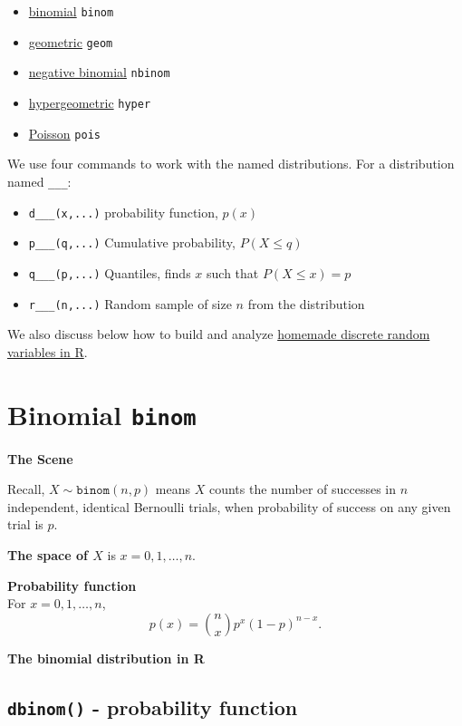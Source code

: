 \documentclass[
]{book}
\providecommand{\tightlist}{%
  \setlength{\itemsep}{0pt}\setlength{\parskip}{0pt}}
\theoremstyle{definition}
\theoremstyle{definition}
\theoremstyle{definition}
\theoremstyle{definition}
\theoremstyle{remark}
\begin{document}
\begin{itemize}
\tightlist
\item
  \hyperref[binomialR]{binomial} \textbar{} \texttt{binom}
\item
  \hyperref[geometricR]{geometric} \textbar{} \texttt{geom}
\item
  \hyperref[negbinomR]{negative binomial} \textbar{} \texttt{nbinom}
\item
  \hyperref[hyperR]{hypergeometric} \textbar{} \texttt{hyper}
\item
  \hyperref[poissonR]{Poisson} \textbar{} \texttt{pois}
\end{itemize}

We use four commands to work with the named distributions. For a distribution named \texttt{\_\_\_}:

\begin{itemize}
\tightlist
\item
  \texttt{d\_\_\_(x,...)} \textbar{} probability function, \(p(x)\)
\item
  \texttt{p\_\_\_(q,...)} \textbar{} Cumulative probability, \(P(X \leq q)\)
\item
  \texttt{q\_\_\_(p,...)} \textbar{} Quantiles, finds \(x\) such that \(P(X \leq x) = p\)
\item
  \texttt{r\_\_\_(n,...)} \textbar{} Random sample of size \(n\) from the distribution
\end{itemize}

We also discuss below how to build and analyze \hyperref[custom-discrete-R]{homemade discrete random variables in R}.

\section{\texorpdfstring{Binomial \texttt{binom}}{Binomial binom}}\label{binomialR}

\textbf{The Scene}

Recall, \(X \sim \texttt{binom}(n,p)\) means \(X\) counts the number of successes in \(n\) independent, identical Bernoulli trials, when probability of success on any given trial is \(p\).

\textbf{The space of \(X\)} is \(x = 0, 1, \ldots, n\).

\textbf{Probability function}\\
For \(x = 0, 1, \ldots, n\), \[p(x)=\binom{n}{x}p^x(1-p)^{n-x}.\]

\textbf{The binomial distribution in R}

\subsection*{\texorpdfstring{\texttt{dbinom()} - probability function}{dbinom() - probability function}}\label{dbinom---probability-function}
\end{document}
